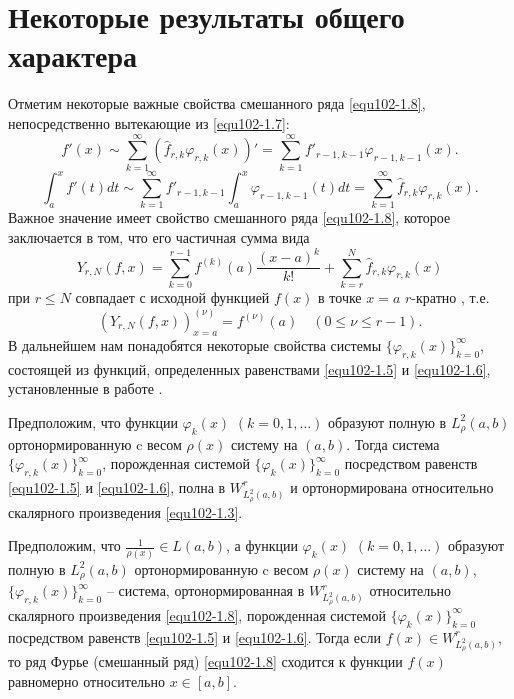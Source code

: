 \section{Некоторые результаты общего характера }

Отметим некоторые важные свойства смешанного ряда \eqref{equ102-1.8}, непосредственно вытекающие из \eqref{equ102-1.7}:
\begin{equation}\label{equ102-2.1}
f'(x)\sim \sum_{k=1}^\infty (\hat f_{r,k}\varphi_{r,k}(x))'= \sum_{k=1}^\infty f'_{r-1,k-1}\varphi_{r-1,k-1}(x).
\end{equation}
\begin{equation}\label{equ102-2.2}
\int_a^xf'(t)dt\sim \sum_{k=1}^\infty f'_{r-1,k-1}\int_a^x\varphi_{r-1,k-1}(t)dt=\sum_{k=1}^\infty \hat f_{r,k}\varphi_{r,k}(x).
\end{equation}
Важное значение имеет свойство  смешанного ряда \eqref{equ102-1.8}, которое заключается в том, что его частичная сумма вида
\begin{equation}\label{equ102-2.3}
Y_{r,N}(f,x)=\sum_{k=0}^{r-1} f^{(k)}(a)\frac{(x-a)^k}{k!}+ \sum_{k=r}^{N} \hat f_{r,k}\varphi_{r,k}(x)
\end{equation}
 при   $r\le N$  совпадает с исходной функцией $f(x)$   в точке $x=a$ $r$-кратно , т.е.
\begin{equation}\label{equ102-2.4}
(Y_{r,N}(f,x))^{(\nu)}_{x=a}=f^{(\nu)}(a)\quad (0\le\nu\le r-1).
\end{equation}
 В дальнейшем нам понадобятся  некоторые  свойства системы $\{\varphi_{r,k}(x)\}_{k=0}^\infty$, состоящей из функций, определенных равенствами   \eqref{equ102-1.5} и \eqref{equ102-1.6}, установленные в работе \cite{Shar20}.

\begin{theoremA}\label{equtheo1}
Предположим, что    функции $\varphi_k(x)$ $(k=0,1,\ldots)$ образуют полную в $L^2_\rho(a,b)$ ортонормированную   c весом   $\rho(x)$ систему на  $(a,b)$. Тогда система $\{\varphi_{r,k}(x)\}_{k=0}^\infty$, порожденная системой $\{\varphi_{k}(x)\}_{k=0}^\infty$ посредством равенств \eqref{equ102-1.5} и \eqref{equ102-1.6}, полна  в $W^r_{L^2_\rho(a,b)}$ и ортонормирована относительно скалярного произведения \eqref{equ102-1.3}.
\end{theoremA}


\begin{theoremA}\label{equtheo2}
Предположим, что  $ \frac{1}{\rho(x)}\in L(a,b) $, а  функции $\varphi_k(x)$ $(k=0,1,\ldots)$  образуют полную в $L^2_\rho(a,b)$ ортонормированную   c весом   $\rho(x)$ систему на $(a,b)$, $\{\varphi_{r,k}(x)\}_{k=0}^\infty$ -- система, ортонормированная в $W^r_{L^2_\rho(a,b)}$ относительно скалярного произведения \eqref{equ102-1.8},  порожденная системой $\{\varphi_{k}(x)\}_{k=0}^\infty$ посредством равенств \eqref{equ102-1.5} и \eqref{equ102-1.6}.
Тогда если $f(x)\in W^r_{L^2_\rho(a,b)}$, то ряд Фурье (смешанный ряд) \eqref{equ102-1.8} сходится к функции $f(x)$ равномерно относительно $x\in[a,b]$.
\end{theoremA}


